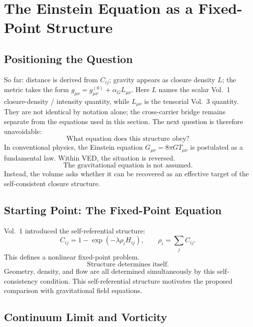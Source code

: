 \section{The Einstein Equation as a Fixed-Point Structure}
\label{sec:einstein}

\subsection{Positioning the Question}

So far: distance is derived from $C_{ij}$;
gravity appears as closure density $L$;
the metric takes the form $g_{\mu\nu} = g^{(0)}_{\mu\nu} + \alpha_G L_{\mu\nu}$.
Here $L$ names the scalar Vol.~1 closure-density / intensity quantity, while
$L_{\mu\nu}$ is the tensorial Vol.~3 quantity. They are not identical by
notation alone; the cross-carrier bridge remains separate from the equations
used in this section.
The next question is therefore unavoidable:
\begin{equation}
  \boxed{\text{What equation does this structure obey?}}
\end{equation}
In conventional physics, the Einstein equation
$G_{\mu\nu} = 8\pi G T_{\mu\nu}$
is postulated as a fundamental law.
Within VED, the situation is reversed.
\begin{equation}
  \boxed{\text{The gravitational equation is not assumed.}}
\end{equation}
Instead, the volume asks whether it can be recovered as an effective target of
the self-consistent closure structure.

\subsection{Starting Point: The Fixed-Point Equation}

Vol.~1 introduced the self-referential structure:
\begin{equation}
  C_{ij} = 1 - \exp(-\lambda \rho_i H_{ij}),
  \qquad
  \rho_i = \sum_j C_{ij}.
\end{equation}
This defines a nonlinear fixed-point problem.
\begin{equation}
  \boxed{\text{Structure determines itself.}}
\end{equation}
Geometry, density, and flow are all determined simultaneously
by this self-consistency condition.
This self-referential structure motivates the proposed comparison with
gravitational field equations.

\subsection{Continuum Limit and Vorticity}

